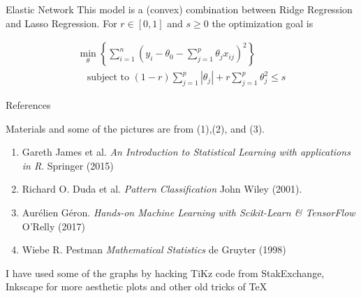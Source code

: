 \documentclass{beamer}
\begin{document}
\begin{frame}{Elastic Network}
This model is a (convex) combination between Ridge Regression and Lasso Regression. For $r \in [0,1]$ and $s \ge 0$ the optimization goal is

\begin{equation*}
	\begin{split}
\min_{\theta} \left\{ \sum_{i=1}^n \left( y_i - \theta_0 - \sum_{j=1}^p \theta_j x_{ij} \right)^2 \right\}  \\
\quad\textrm{subject to }   (1-r)\sum_{j=1}^p |\theta_j | + r \sum_{j=1}^p \theta_j^2 \le s
	\end{split}
\end{equation*} 

\end{frame}


\begin{frame}{References}
	
	Materials and some of the pictures are from (1),(2), and (3).
	\begin{enumerate}
		\item Gareth James et al. {\it An Introduction to Statistical Learning with applications in R}. Springer (2015)
		\item Richard O. Duda et al. {\it Pattern Classification} John Wiley (2001). 
		\item Aur\'elien G\'eron. {\it Hands-on Machine Learning with Scikit-Learn \& TensorFlow} O'Relly (2017)
		\item Wiebe R. Pestman {\it Mathematical Statistics} de Gruyter (1998)
	\end{enumerate}	
	
	I have used some of the graphs by hacking TiKz code from StakExchange, Inkscape for more aesthetic plots and other old tricks of \TeX
\end{frame}		
\end{document}
